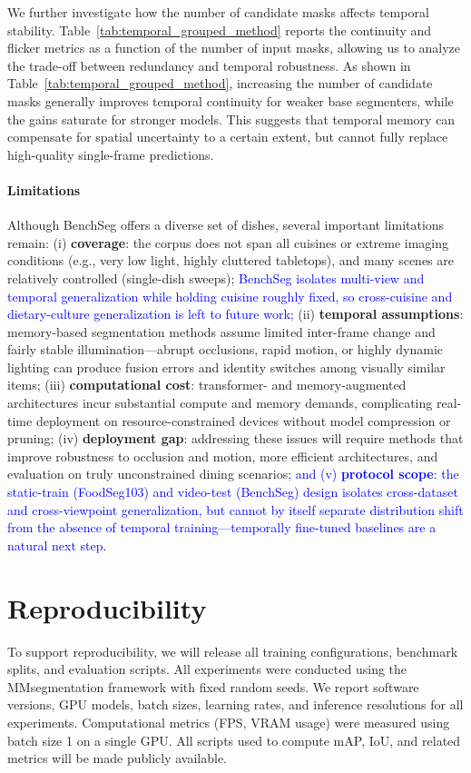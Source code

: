 \documentclass[preprint,12pt]{elsarticle}
\newcommand{\change}[1]{\textcolor{blue}{#1}}
\begin{document}
We further investigate how the number of candidate masks affects temporal stability. Table~\ref{tab:temporal_grouped_method} reports the continuity and flicker metrics as a function of the number of input masks, allowing us to analyze the trade-off between redundancy and temporal robustness. As shown in Table~\ref{tab:temporal_grouped_method}, increasing the number of candidate masks generally improves temporal continuity for weaker base segmenters, while the gains saturate for stronger models. This suggests that temporal memory can compensate for spatial uncertainty to a certain extent, but cannot fully replace high-quality single-frame predictions.



\paragraph{Limitations} Although BenchSeg offers a diverse set of dishes, several important limitations remain: (i) \textbf{coverage}: the corpus does not span all cuisines or extreme imaging conditions (e.g., very low light, highly cluttered tabletops), and many scenes are relatively controlled (single-dish sweeps); \change{BenchSeg isolates multi-view and temporal generalization while holding cuisine roughly fixed, so cross-cuisine and dietary-culture generalization is left to future work;} (ii) \textbf{temporal assumptions}: memory-based segmentation methods assume limited inter-frame change and fairly stable illumination—abrupt occlusions, rapid motion, or highly dynamic lighting can produce fusion errors and identity switches among visually similar items; (iii) \textbf{computational cost}: transformer- and memory-augmented architectures incur substantial compute and memory demands, complicating real-time deployment on resource-constrained devices without model compression or pruning; (iv) \textbf{deployment gap}: addressing these issues will require methods that improve robustness to occlusion and motion, more efficient architectures, and evaluation on truly unconstrained dining scenarios\change{; and (v) \textbf{protocol scope}: the static-train (FoodSeg103) and video-test (BenchSeg) design isolates cross-dataset and cross-viewpoint generalization, but cannot by itself separate distribution shift from the absence of temporal training—temporally fine-tuned baselines are a natural next step}.

\section{Reproducibility}
To support reproducibility, we will release all training configurations, benchmark splits, and evaluation scripts. All experiments were conducted using the MMsegmentation framework with fixed random seeds. We report software versions, GPU models, batch sizes, learning rates, and inference resolutions for all experiments. Computational metrics (FPS, VRAM usage) were measured using batch size 1 on a single GPU. All scripts used to compute mAP, IoU, and related metrics will be made publicly available.
\end{document}
